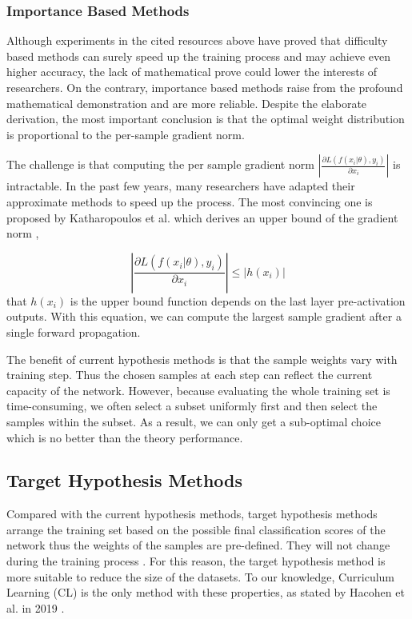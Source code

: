 \subsubsection{Importance Based Methods}
\label{ibalgorithm}
Although experiments in the cited resources above have proved that difficulty based methods can surely speed up the training process and may achieve even higher accuracy, the lack of mathematical prove could lower the interests of researchers. On the contrary, importance based methods raise from the profound mathematical demonstration \cite{Zhao2015} and are more reliable. Despite the elaborate derivation, the most important conclusion is that the optimal weight distribution is proportional to the per-sample gradient norm.

The challenge is that computing the per sample gradient norm $|\frac{\partial{L(f(x_i|\theta), y_i)}}{\partial{x_i}}|$ is intractable. In the past few years, many researchers have adapted their approximate methods to speed up the process. The most convincing one is proposed by Katharopoulos et al. which derives an upper bound of the gradient norm \cite{Katharopoulos2018},

\begin{equation}
	|\frac{\partial{L(f(x_i|\theta), y_i)}}{\partial{x_i}}|  \leq |h(x_i)|\end{equation}
that $h(x_i)$ is the upper bound function depends on the last layer pre-activation outputs. With this equation, we can compute the largest sample gradient after a single forward propagation. 

The benefit of current hypothesis methods is that the sample weights vary with training step. Thus the chosen samples at each step can reflect the current capacity of the network. However, because evaluating the whole training set is time-consuming, we often select a subset uniformly first and then select the samples within the subset. As a result, we can only get a sub-optimal choice which is no better than the theory performance. 

\subsection{Target Hypothesis Methods}
Compared with the current hypothesis methods, target hypothesis methods arrange the training set based on the possible final classification scores of the network thus the weights of the samples are pre-defined. They will not change during the training process \cite{Bengio2009}. For this reason, the target hypothesis method is more suitable to reduce the size of the datasets. To our knowledge, Curriculum Learning (CL) is the only method with these properties, as stated by Hacohen et al. in 2019 \cite{Hacohen2019a}.

